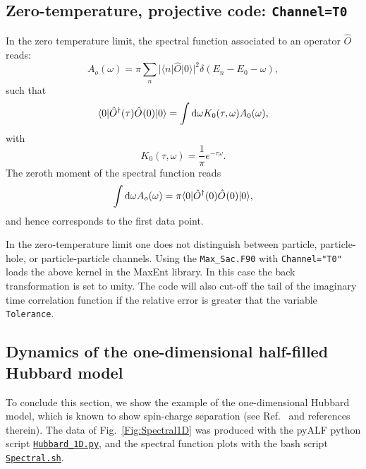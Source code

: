 \subsection{Zero-temperature, projective code:  \texttt{Channel=T0}}

 In the zero temperature limit,  the spectral function associated to an operator $\hat{O} $    reads:
 \begin{equation}
 	  A_o(\omega)    = \pi  \sum_{n}    | \langle n  | \hat{O} | 0 \rangle |^2 \delta( E_n - E_0 - \omega) ,
 \end{equation}
 such that 
 \begin{equation}
 	\langle 0 | \hat{O}^{\dagger}(\tau) \hat{O}^{}(0) | 0 \rangle =  \int \mathrm{d}\omega  K_0(\tau,\omega) A_0(\omega) ,
 \end{equation}
 with 
 \begin{equation}
 	K_0(\tau,\omega)  = \frac{1}{\pi}e^{-\tau \omega}.
 \end{equation}
 The zeroth moment of the spectral function reads
 \begin{equation}
  \int \mathrm{d} \omega A_o(\omega) = \pi \langle 0 | \hat{O}^{\dagger}(0) \hat{O}^{}(0) | 0 \rangle, 
 \end{equation}
 and hence corresponds to the first data point.
 
 In the zero-temperature limit one does not distinguish between  particle, particle-hole, or particle-particle channels.
 Using the \texttt{Max\_Sac.F90}  with \texttt{Channel="T0"} loads the above kernel in the MaxEnt library. In this case the back  transformation is set to unity. 
 The code will also cut-off the tail of the  imaginary time correlation function  if the relative error is greater that the variable \texttt{Tolerance}. 
 
 \subsection{Dynamics of the one-dimensional half-filled Hubbard model}

To conclude this section, we show the example of the one-dimensional Hubbard model, which is known to show spin-charge separation (see Ref.~\cite{Abendschein06}  and references therein).    The data of Fig.~\ref{Fig:Spectral1D}    was produced with the pyALF python script  \href{https://git.physik.uni-wuerzburg.de/ALF/ALF/-/blob/ALF-2.0/Documentation/Figures/MaxEnt/Hubbard_1D.py}{\texttt{Hubbard\_1D.py}}, and   the spectral function plots with the bash script \href{https://git.physik.uni-wuerzburg.de/ALF/ALF/-/blob/ALF-2.0/Documentation/Figures/MaxEnt/Spectral.sh}{\texttt{Spectral.sh}}. 

